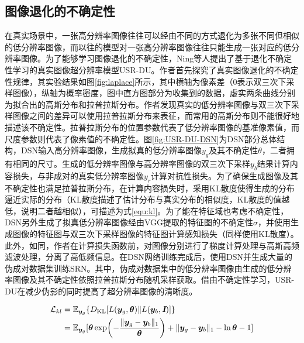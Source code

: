 \subsection{图像退化的不确定性}
在真实场景中，一张高分辨率图像往往可以经由不同的方式退化为多张不同但相似的低分辨率图像，而以往的模型对一张高分辨率图像往往只能生成一张对应的低分辨率图像。为了能够学习图像退化的不确定性，Ning等人\cite{ijcai2022p176}提出了基于退化不确定性学习的真实图像超分辨率模型USR-DU。作者首先探究了真实图像退化的不确定性规律，其实验结果如图\ref{fig:laplace}所示，其中横轴为像素差（0表示双三次下采样图像），纵轴为概率密度，图中直方图部分为收集到的数据，虚实两条曲线分别为拟合出的高斯分布和拉普拉斯分布。作者发现真实的低分辨率图像与双三次下采样图像之间的差异可以使用拉普拉斯分布来表征，而常用的高斯分布则不能很好地描述该不确定性。拉普拉斯分布的位置参数代表了低分辨率图像的基准像素值，而尺度参数则代表了像素值的不确定性。图\ref{fig:USR-DU-DSN}为DSN部分总体结构，DSN输入高分辨率图像，生成拟真的低分辨率图像$y_g$及其不确定性$\theta$，二者拥有相同的尺寸。生成的低分辨率图像与高分辨率图像的双三次下采样$y_b$结果计算内容损失，与非成对的真实低分辨率图像$y_r$计算对抗性损失。为了确保生成图像及其不确定性也满足拉普拉斯分布，在计算内容损失时，采用KL散度使得生成的分布逼近实际的分布（KL散度描述了估计分布与真实分布的相似度，KL散度的值越低，说明二者越相似），可描述为式\ref{equ:kl}。为了能在特征域也考虑不确定性，DSN另外生成了拟真低分辨率图像经由VGG\cite{simonyan2014very}提取的特征图的不确定性$\sigma$，并使用生成图像的特征图与双三次下采样图像的特征图计算感知损失（同样使用KL散度）。此外，如同\cite{fritsche2019frequency}，作者在计算损失函数前，对图像分别进行了梯度计算处理与高斯高频滤波处理，分离了高低频信息。在DSN网络训练完成后，使用DSN并生成大量的伪成对数据集训练SRN。其中，伪成对数据集中的低分辨率图像由生成的低分辨率图像及其不确定性依照拉普拉斯分布随机采样获取。借由不确定性学习，USR-DU在减少伪影的同时提高了超分辨率图像的清晰度。



\begin{equation}
    \begin{aligned}
        \mathcal{L}_{kl}&=\mathbb{E}_{\vb*{y}_g}\{D_{\text{KL}}[L(\vb*{y}_g,\bm{\theta})\|L(\vb*{y}_b,\textbf{\em I})]\}  \\
        &=\mathbb{E}_{\vb*{y}_g}[\bm{\theta}\exp(-\frac{\|\vb*{y}_g-\vb*{y}_b\|_1}{\bm{\theta}})+\|\vb*{y}_g-\vb*{y}_b\|_1-\ln\bm{\theta}-1]
    \end{aligned}
    \label{equ:kl}
\end{equation}








